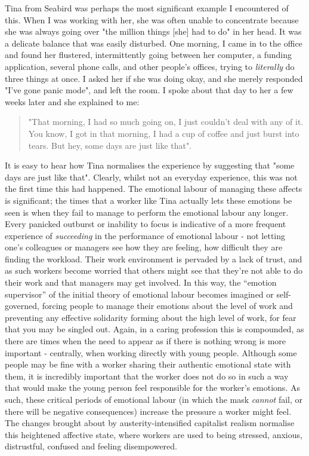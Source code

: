 Tina from Seabird was perhaps the most significant example I encountered of this. When I was working with her, she was often unable to concentrate because she was always going over "the million things [she] had to do" in her head. It was a delicate balance that was easily disturbed. One morning, I came in to the office and found her flustered, intermittently going between her computer, a funding application, several phone calls, and other people's offices, trying to \emph{literally} do three things at once. I asked her if she was doing okay, and she merely responded "I've gone panic mode", and left the room. I spoke about that day to her a few weeks later and she explained to me: 
\begin{quote} 
"That morning, I had so much going on, I just couldn't deal with any of it. You know, I got in that morning, I had a cup of coffee and just burst into tears. But hey, some days are just like that".
\end{quote}
It is easy to hear how Tina normalises the experience by suggesting that "some days are just like that". Clearly, whilst not an everyday experience, this was not the first time this had happened. The emotional labour of managing these affects is significant; the times that a worker like Tina actually lets these emotions be seen is when they fail to manage to perform the emotional labour any longer. Every panicked outburst or inability to focus is indicative of a more frequent experience of \emph{succeeding} in the performance of emotional labour - not letting one's colleagues or managers see how they are feeling, how difficult they are finding the workload. Their work environment is pervaded by a lack of trust, and as such workers become worried that others might see that they’re not able to do their work and that managers may get involved. In this way, the “emotion supervisor” of the initial theory of emotional labour becomes imagined or self-governed, forcing people to manage their emotions about the level of work and preventing any effective solidarity forming about the high level of work, for fear that you may be singled out. Again, in a caring profession this is compounded, as there are times when the need to appear as if there is nothing wrong is more important - centrally, when working directly with young people. Although some people may be fine with a worker sharing their authentic emotional state with them, it is incredibly important that the worker does not do so in such a way that would make the young person feel responsible for the worker's emotions. As such, these critical periods of emotional labour (in which the mask \emph{cannot} fail, or there will be negative consequences) increase the pressure a worker might feel. The changes brought about by austerity-intensified capitalist realism normalise this heightened affective state, where workers are used to being stressed, anxious, distrustful, confused and feeling disempowered.

